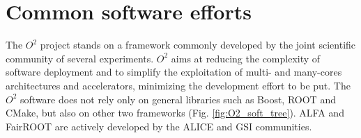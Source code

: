 
\section{Common software efforts}
The $O^2$ project stands on a framework commonly developed by the joint scientific community of several experiments.
$O^2$ aims at reducing the complexity of software deployment and to simplify the exploitation of multi- and many-cores architectures and accelerators, minimizing the development effort to be put.
The $O^2$ software does not rely only on general libraries such as Boost, ROOT and CMake, but also on other two frameworks (Fig. \ref{fig:O2_soft_tree}).
ALFA \cite{alfa} and FairROOT \cite{fairroot} are actively developed by the ALICE and GSI communities.

